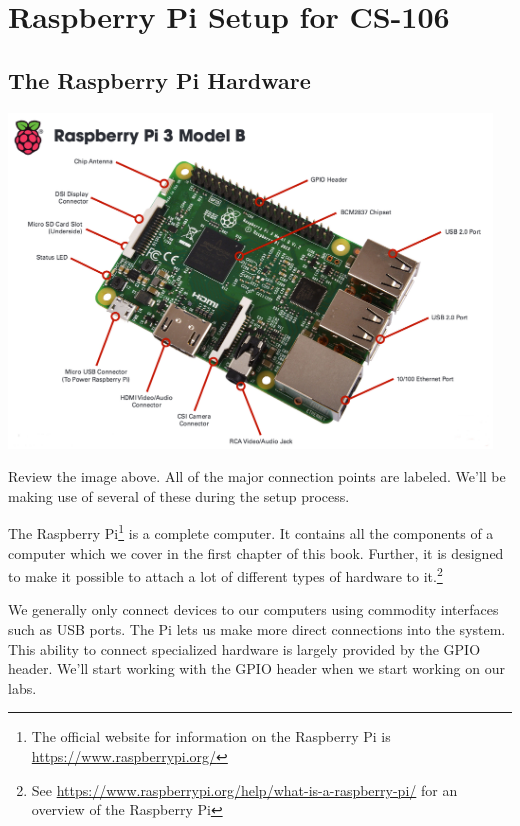 
\chapter{Raspberry Pi Setup for CS-106}


\section{The Raspberry Pi Hardware}

\beforefig
\centerline{\includegraphics[height=3.50in]{pi_images/Raspi-3-Layout.jpg}}
\afterfig


Review the image above. All of the major connection points are labeled. We'll be making use of several of these during the setup process.

The Raspberry Pi\footnote{The official website for information on the Raspberry Pi is \url{https://www.raspberrypi.org/}} is a complete computer. It contains all the components of a computer which we cover in the first chapter of this book. Further, it is designed to make it possible to attach a lot of different types of hardware to it.\footnote{See \url{https://www.raspberrypi.org/help/what-is-a-raspberry-pi/} for an overview of the Raspberry Pi}

We generally only connect devices to our computers using commodity interfaces such as USB ports. The Pi lets us make more direct connections into the system. This ability to connect specialized hardware is largely provided by the GPIO header. We'll start working with the GPIO header when we start working on our labs.

